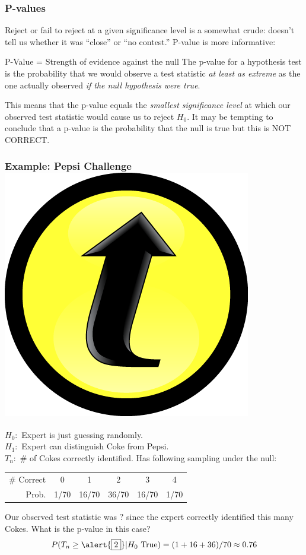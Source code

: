 \documentclass[handout]{beamer}
\begin{document}
\begin{frame}
\frametitle{P-values}
Reject or fail to reject at a given significance level is a somewhat crude: doesn't tell us whether it was ``close'' or ``no contest.'' P-value is more informative: \pause
	\begin{block}{P-Value = Strength of evidence against the null}
	The p-value for a hypothesis test is the probability that we would observe a test statistic \emph{at least as extreme} as the one actually observed \emph{if the null hypothesis were true}.
\end{block}
\pause
\vspace{1em}
\alert{This means that the p-value equals the \emph{smallest significance level} at which our observed test statistic would cause us to reject $H_0$. It may be tempting to conclude that a p-value is the probability that the null is true but this is NOT CORRECT.}
\end{frame}

\begin{frame}
\frametitle{Example: Pepsi Challenge \hfill \includegraphics[scale = 0.05]{./images/clicker}}
\footnotesize 
$H_0\colon$ Expert is just guessing randomly.\\
$H_1\colon$ Expert can distinguish Coke from Pepsi.\\
$T_n\colon$ \# of Cokes correctly identified. Has following sampling under the null:
		\begin{center}
		\begin{tabular}{rccccc}
		\hline \footnotesize
		\# Correct & 0 & 1 & 2 & 3 & 4\\
		Prob.&1/70 & 16/70 & 36/70 & 16/70 &1/70\\
		\hline
		\end{tabular}
	\end{center}
	\vspace{2em}
	\normalsize
	\alert{Our observed test statistic was $\boxed{?}$ since the expert correctly identified this many Cokes. What is the p-value in this case?}\pause
	\begin{eqnarray*}
		P(T_n \geq \alert{\boxed{2}}|H_0 \mbox{ True}) = (1 + 16 + 36)/70 \approx 0.76
	\end{eqnarray*}
\end{frame}

\end{document}

